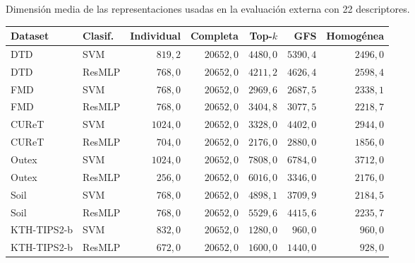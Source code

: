 \begin{resulttable}
\centering\fontsize{8}{10}\selectfont\setlength{\tabcolsep}{3.0pt}
\caption{Dimensión media de las representaciones usadas en la evaluación externa con 22 descriptores.}
\label{tab:dimensiones}
\begin{tabular}{@{}llrrrrr@{}}
\toprule
Dataset & Clasif. & Individual & Completa & Top-$k$ & GFS & Homogénea \\
\midrule
DTD & SVM & $819{,}2$ & $20652{,}0$ & $4480{,}0$ & $5390{,}4$ & $2496{,}0$ \\
DTD & ResMLP & $768{,}0$ & $20652{,}0$ & $4211{,}2$ & $4626{,}4$ & $2598{,}4$ \\
FMD & SVM & $768{,}0$ & $20652{,}0$ & $2969{,}6$ & $2687{,}5$ & $2338{,}1$ \\
FMD & ResMLP & $768{,}0$ & $20652{,}0$ & $3404{,}8$ & $3077{,}5$ & $2218{,}7$ \\
CUReT & SVM & $1024{,}0$ & $20652{,}0$ & $3328{,}0$ & $4402{,}0$ & $2944{,}0$ \\
CUReT & ResMLP & $704{,}0$ & $20652{,}0$ & $2176{,}0$ & $2880{,}0$ & $1856{,}0$ \\
Outex & SVM & $1024{,}0$ & $20652{,}0$ & $7808{,}0$ & $6784{,}0$ & $3712{,}0$ \\
Outex & ResMLP & $256{,}0$ & $20652{,}0$ & $6016{,}0$ & $3346{,}0$ & $2176{,}0$ \\
Soil & SVM & $768{,}0$ & $20652{,}0$ & $4898{,}1$ & $3709{,}9$ & $2184{,}5$ \\
Soil & ResMLP & $768{,}0$ & $20652{,}0$ & $5529{,}6$ & $4415{,}6$ & $2235{,}7$ \\
KTH-TIPS2-b & SVM & $832{,}0$ & $20652{,}0$ & $1280{,}0$ & $960{,}0$ & $960{,}0$ \\
KTH-TIPS2-b & ResMLP & $672{,}0$ & $20652{,}0$ & $1600{,}0$ & $1440{,}0$ & $928{,}0$ \\
\bottomrule
\end{tabular}
\par{}
\end{resulttable}
\FloatBarrier
